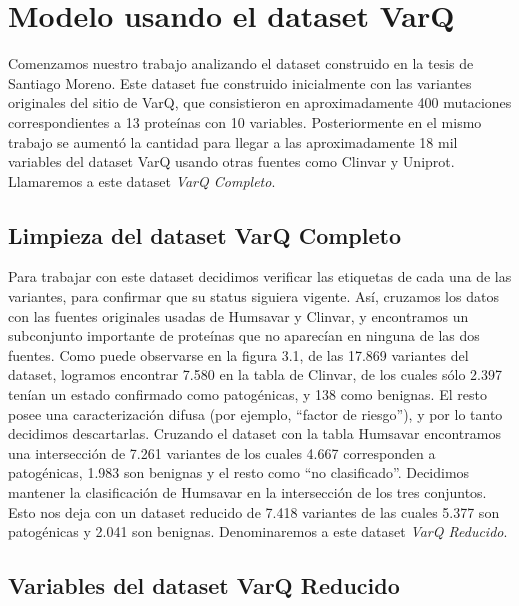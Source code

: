 \section{Modelo usando el dataset VarQ}

Comenzamos nuestro trabajo analizando el dataset construido en la tesis de Santiago Moreno. Este dataset fue construido inicialmente con las variantes originales del sitio de VarQ, que consistieron en aproximadamente 400 mutaciones correspondientes a 13 proteínas con 10 variables. Posteriormente en el mismo trabajo se aumentó la cantidad para llegar a las aproximadamente 18 mil variables del dataset VarQ usando otras fuentes como Clinvar y Uniprot. Llamaremos a este dataset \textit{VarQ Completo}. 

\subsection{Limpieza del dataset VarQ Completo}

Para trabajar con este dataset decidimos verificar las etiquetas de cada una de las variantes, para confirmar que su status siguiera vigente. Así, cruzamos los datos con las fuentes originales usadas de Humsavar y Clinvar, y encontramos un subconjunto importante de proteínas que no aparecían en ninguna de las dos fuentes. Como puede observarse en la figura 3.1, de las 17.869 variantes del dataset, logramos encontrar 7.580 en la tabla de Clinvar, de los cuales sólo 2.397 tenían un estado confirmado como patogénicas, y 138 como benignas. El resto posee una caracterización difusa (por ejemplo, ``factor de riesgo''), y por lo tanto decidimos descartarlas. Cruzando el dataset con la tabla Humsavar encontramos una intersección de 7.261 variantes de los cuales 4.667 corresponden a patogénicas, 1.983 son benignas y el resto como ``no clasificado''. Decidimos mantener la clasificación de Humsavar en la intersección de los tres conjuntos. Esto nos deja con un dataset reducido de 7.418 variantes de las cuales 5.377 son patogénicas y 2.041 son benignas. Denominaremos a este dataset \textit{VarQ Reducido}. 

\subsection{Variables del dataset VarQ Reducido}

